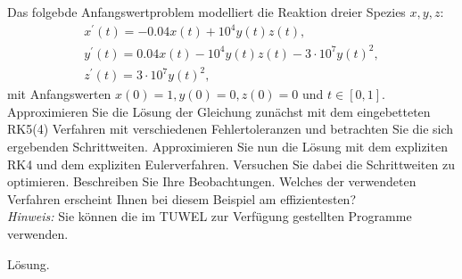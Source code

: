 \begin{exercise}
Das folgebde Anfangswertproblem modelliert die Reaktion dreier Spezies
$x,y,z:$
\begin{align*}
  x^{\prime}(t) = -0.04x(t) + 10^4y(t)z(t), \\
  y^{\prime}(t) = 0.04x(t) - 10^4y(t)z(t) - 3\cdot10^7y(t)^2, \\
  z^{\prime}(t) = 3\cdot10^7y(t)^2,
\end{align*}
mit Anfangswerten $x(0) = 1, y(0) = 0, z(0) = 0$ und $t \in [0,1]$.
Approximieren Sie die Lösung der Gleichung zunächst mit dem
eingebetteten RK5(4) Verfahren mit verschiedenen Fehlertoleranzen und
betrachten Sie die sich ergebenden Schrittweiten. Approximieren Sie nun
die Lösung mit dem expliziten RK4 und dem expliziten Eulerverfahren.
Versuchen Sie dabei die Schrittweiten zu optimieren. Beschreiben Sie
Ihre Beobachtungen. Welches der verwendeten Verfahren erscheint Ihnen
bei diesem Beispiel am effizientesten? \\
\textit{Hinweis:} Sie können die im TUWEL zur Verfügung gestellten
Programme verwenden.
\end{exercise}
\begin{solution}
Lösung.
\end{solution}
